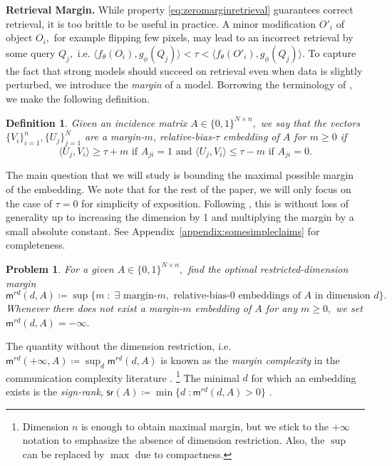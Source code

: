 \documentclass[preprint]{article}
\newtheorem{definition}{Definition}[]
\newtheorem{problem}{Problem}[]
\newcommand{\maxmargin}{\mathsf{m}^{rd}}
\newcommand{\signrank}{\mathsf{sr}}
\begin{document}
\textbf{{Retrieval Margin.}} While property \eqref{eq:zeromarginretrieval} guarantees correct retrieval, it is too brittle to be useful in practice. A minor modification $O'_i$ of object $O_i,$ for example flipping few pixels, may lead to an incorrect retrieval by some query $Q_j,$ i.e. 
$\langle f_\theta(O_i), g_\phi(Q_j)\rangle <
\tau <
\langle f_\theta(O'_i), g_\phi(Q_j)\rangle.$ To capture the fact that strong models should succeed on retrieval even when data is slightly perturbed, we introduce the \emph{margin} of a model. Borrowing the terminology of \cite{bangachev2025globalminimizerssigmoidcontrastive}, we make the following definition.

\begin{definition}
\label{def:maindefinition}
Given an incidence matrix $A\in \{0,1\}^{N\times n},$ we say that the vectors $\{V_i\}_{i = 1}^n , \{U_j\}_{j = 1}^N$ are a margin-$m$, relative-bias-$\tau$ embedding of $A$ for $m\ge 0$ if
\begin{equation}
\label{eq:marginretrieval}
   \langle U_j, V_i\rangle \ge \tau +m \text{ if }A_{ji}=1\text{ and }\langle U_j, V_i\rangle \le \tau-m \text{ if }A_{ji} = 0. 
\end{equation}
\end{definition}

The main question that we will study is bounding the maximal possible margin of the embedding. We note that for the rest of the paper, we will only focus on the case of $\tau = 0$ for simplicity of exposition. Following \cite{weller2025theoretical}, this is without loss of generality up to increasing the dimension by 1 and multiplying the margin by a small absolute constant. See Appendix~\ref{appendix:somesimpleclaims} for completeness.
\begin{problem}
\label{problem:mainproblem}
For a given $A\in \{0,1\}^{N\times n},$ find the optimal restricted-dimension margin 
$$\maxmargin(d, A)
\coloneqq \sup \{ m \; : \; \exists \text{ margin-}m,\text{ relative-bias-}0\text{ embeddings of }A\text{ in dimension }d\}.
$$ 
Whenever there does not exist a margin-$m$ embedding of $A$ for any $m\ge 0,$ we set $\maxmargin (d, A) = -\infty.$ 
\end{problem}
The quantity without the dimension restriction, i.e. $\maxmargin(+\infty, A) \coloneqq \sup_d \maxmargin(d, A)$ is known as the \emph{margin complexity} in the communication complexity literature \cite{sherstov2009lower}. \footnote{Dimension $n$ is enough to obtain maximal margin, but we stick to the $+\infty$ notation to emphasize the absence of dimension restriction. Also, the $\sup$ can be replaced by $\max$ due to compactness.} The minimal $d$ for which an embedding exists is the \emph{sign-rank}, 
$\signrank(A)\coloneqq \min \{ d\; : \maxmargin(d, A)> 0\}$ \cite{AlonFranklRodl1985}.
\end{document}
